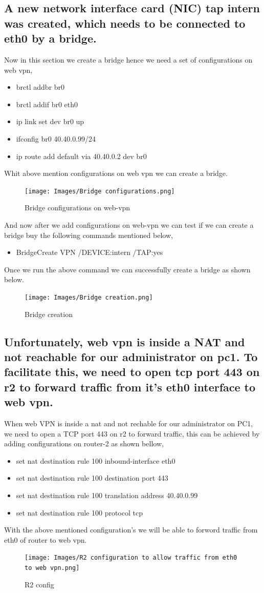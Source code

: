 \subsection{A new network interface card (NIC) tap intern was created, which needs
to be connected to eth0 by a bridge.
}
Now in this section we create a bridge hence we need a set of configurations on web vpn,
\begin{itemize}
 \item brctl addbr br0
 \item brctl addif br0 eth0
 \item ip link set dev br0 up
 \item ifconfig br0 40.40.0.99/24
 \item ip route add default via 40.40.0.2 dev br0
\end{itemize}
Whit above mention configurations on web vpn
we can create a bridge.
\begin{figure}[H]
\centering
  \texttt{[image: Images/Bridge configurations.png]}
  \caption{Bridge configurations on web-vpn}
  \label{fig }
\end{figure}
And now after we add configurations on web-vpn we can test if we can create a bridge buy the following commands mentioned below,
\begin{itemize}
\item BridgeCreate VPN /DEVICE:intern /TAP:yes
\end{itemize}
Once we run the above command we can successfully create a bridge as shown below.
\begin{figure}[H]
\centering
  \texttt{[image: Images/Bridge creation.png]}
  \caption{Bridge creation}
  \label{fig }
\end{figure}

\subsection{Unfortunately, web vpn is inside a NAT and not reachable for our administrator
on pc1. To facilitate this, we need to open tcp port 443 on r2 to forward traffic
from it’s eth0 interface to web vpn.}
When web VPN is inside a nat and not rechable for our administrator on PC1, we need to open a TCP port 443 on r2 to forward traffic, this can be achieved by adding configurations on router-2 as shown bellow,
\begin{itemize}
    \item set nat destination rule 100 inbound-interface eth0
    \item set nat destination rule 100 destination port 443
    \item set nat destination rule 100 translation address 40.40.0.99
    \item set nat destination rule 100 protocol tcp
\end{itemize}
With the above mentioned configuration's we will be able to forword traffic from eth0 of router to web vpn.
\begin{figure}[H]
\centering
  \texttt{[image: Images/R2 configuration to allow traffic from eth0 to web vpn.png]}
  \caption{R2 config }
  \label{fig }
\end{figure}

